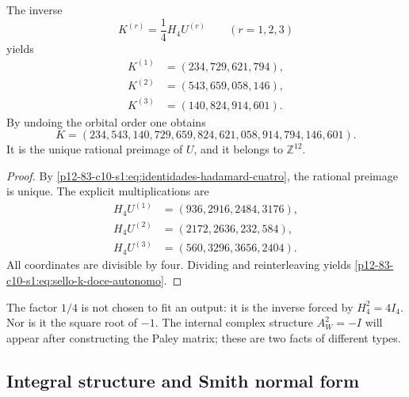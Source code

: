 \begin{theorem}
\label{p12-83-c10-s1:thm:reconstruccion-entera-k-hadamard}
The inverse
\begin{equation}
 K^{(r)}=\frac14H_4U^{(r)}
 \qquad(r=1,2,3)
 \label{p12-83-c10-s1:eq:inversion-bloques-hadamard}
\end{equation}
yields
\begin{align*}
 K^{(1)}&=(234,729,621,794),\\
 K^{(2)}&=(543,659,058,146),\\
 K^{(3)}&=(140,824,914,601).
\end{align*}
By undoing the orbital order one obtains
\begin{equation}
 \boxed{
 K=(234,543,140,729,659,824,621,058,914,794,146,601).}
 \label{p12-83-c10-s1:eq:sello-k-doce-autonomo}
\end{equation}
It is the unique rational preimage of \(U\), and it belongs to
\(\mathbb Z^{12}\).
\end{theorem}

\begin{proof}
By \eqref{p12-83-c10-s1:eq:identidades-hadamard-cuatro}, the rational preimage is unique. The explicit multiplications are
\begin{align*}
 H_4U^{(1)}&=(936,2916,2484,3176),\\
 H_4U^{(2)}&=(2172,2636,232,584),\\
 H_4U^{(3)}&=(560,3296,3656,2404).
\end{align*}
All coordinates are divisible by four. Dividing and reinterleaving
yields \eqref{p12-83-c10-s1:eq:sello-k-doce-autonomo}.
\end{proof}

The factor \(1/4\) is not chosen to fit an output: it is the inverse
forced by \(H_4^2=4I_4\). Nor is it the square root of \(-1\). The
internal complex structure \(A_W^2=-I\) will appear after constructing the
Paley matrix; these are two facts of different types.

\subsection{Integral structure and Smith normal form}

